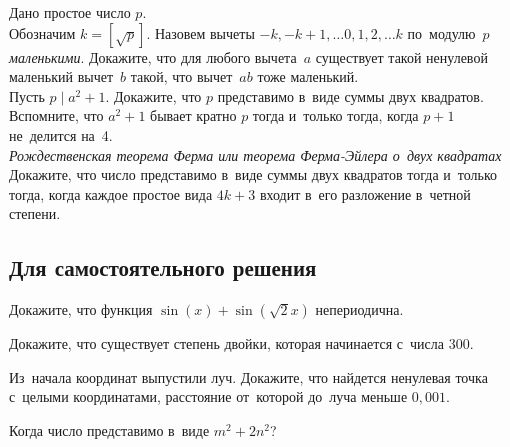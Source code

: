 \begin{problems}

\item
Дано простое число $p$.
\\
\sp
Обозначим $k = [\sqrt{p}]$.
Назовем вычеты $-k, -k+1, \ldots 0, 1, 2, \ldots k$ по~модулю~$p$
\emph{маленькими}.
Докажите, что для любого вычета~$a$ существует такой ненулевой маленький
вычет~$b$ такой, что вычет~$a b$ тоже маленький.
\\
\sp
Пусть $p \mid a^2 + 1$.
Докажите, что $p$ представимо в~виде суммы двух квадратов.
\\
\sp
Вспомните, что $a^2 + 1$ бывает кратно $p$ тогда и~только тогда, когда $p + 1$
не~делится на~4.
\\
\sp
\emph{Рождественская теорема Ферма или теорема Ферма-Эйлера о~двух квадратах}
Докажите, что число представимо в~виде суммы двух квадратов тогда и~только
тогда, когда каждое простое вида $4 k + 3$ входит в~его разложение в~четной
степени.

\end{problems}

\subsection*{Для самостоятельного решения}

\begin{problems}

\item
Докажите, что функция $\sin(x) + \sin(\sqrt{2} x)$ непериодична.

\item
Докажите, что существует степень двойки, которая начинается с~числа $300$.

\item
Из~начала координат выпустили луч.
Докажите, что найдется ненулевая точка с~целыми координатами, расстояние
от~которой до~луча меньше $0{,}001$.

\item
Когда число представимо в~виде $m^2 + 2 n^2$?

\end{problems}

